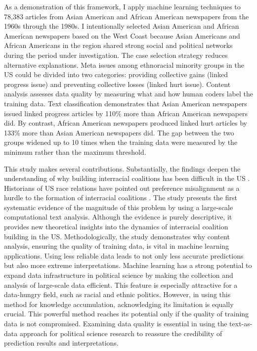 As a demonstration of this framework, I apply machine learning techniques to 78,383 articles from Asian American and African American newspapers from the 1960s through the 1980s. I intentionally selected Asian American and African American newspapers based on the West Coast because Asian Americans and African Americans in the region shared strong social and political networks during the period under investigation. The case selection strategy reduces alternative explanations. Meta issues among ethnoracial minority groups in the US could be divided into two categories: providing collective gains (linked progress issue) and preventing collective losses (linked hurt issue). Content analysis assesses data quality by measuring what and how human coders label the training data. Text classification demonstrates that Asian American newspapers issued linked progress articles by 110\% more than African American newspapers did. By contrast, African American newspapers produced linked hurt articles by 133\% more than Asian American newspapers did. The gap between the two groups widened up to 10 times when the training data were measured by the minimum rather than the maximum threshold. 

This study makes several contributions. Substantially, the findings deepen the understanding of why building interracial coalitions has been difficult in the US \cite{kaufmann2003cracks, rogers2006afro}. Historians of US race relations have pointed out preference misalignment as a hurdle to the formation of interracial coalitions \citep{brilliant2010color, kurashige2010shifting}. The study presents the first systematic evidence of the magnitude of this problem by using a large-scale computational text analysis. Although the evidence is purely descriptive, it provides new theoretical insights into the dynamics of interracial coalition building in the US. Methodologically, the study demonstrates why content analysis, ensuring the quality of training data, is vital in machine learning applications. Using less reliable data leads to not only less accurate predictions but also more extreme interpretations. Machine learning has a strong potential to expand data infrastructure in political science by making the collection and analysis of large-scale data efficient. This feature is especially attractive for a data-hungry field, such as racial and ethnic politics. However, in using this method for knowledge accumulation, acknowledging its limitation is equally crucial. This powerful method reaches its potential only if the quality of training data is not compromised. Examining data quality is essential in using the text-as-data approach for political science research to reassure the credibility of prediction results and interpretations.


